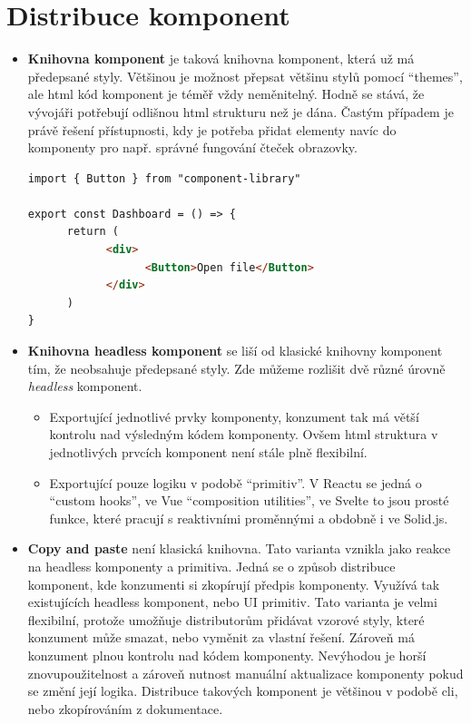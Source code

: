 \section{Distribuce komponent}

\begin{itemize}
  \item \textbf{Knihovna komponent} je taková knihovna komponent, která už má předepsané styly. Většinou je možnost přepsat většinu stylů pomocí ``themes'', ale \gls{html} kód komponent je téměř vždy neměnitelný.
        Hodně se stává, že vývojáři potřebují odlišnou \gls{html} strukturu než je dána.
        Častým případem je právě řešení přístupnosti, kdy je potřeba přidat elementy navíc do komponenty pro např. správné fungování čteček obrazovky.
        \begin{lstlisting}[caption={Ukázka použití komponentové knihovny}, label={component-distribution}, language=html]
import { Button } from "component-library"

export const Dashboard = () => {
      return (
            <div>
                  <Button>Open file</Button>
            </div>
      )
}
\end{lstlisting}
  \item \textbf{Knihovna headless komponent} se liší od klasické knihovny komponent tím, že neobsahuje předepsané styly.
        Zde můžeme rozlišit dvě různé úrovně \textit{headless} komponent.
        \begin{itemize}
          \item Exportující jednotlivé prvky komponenty, konzument tak má větší kontrolu nad výsledným kódem komponenty.
                Ovšem \gls{html} struktura v jednotlivých prvcích komponent není stále plně flexibilní.
          \item Exportující pouze logiku v podobě ``primitiv''. V Reactu se jedná o ``custom hooks'', ve Vue ``composition utilities'', ve Svelte to jsou prosté funkce, které pracují s reaktivními proměnnými a obdobně i ve Solid.js.\label{technology:dist}
        \end{itemize}
  \item \textbf{Copy and paste} není klasická knihovna.
        Tato varianta vznikla jako reakce na headless komponenty a primitiva.
        Jedná se o způsob distribuce komponent, kde konzumenti si zkopírují předpis komponenty.
        Využívá tak existujících headless komponent, nebo UI primitiv.
        Tato varianta je velmi flexibilní, protože umožňuje distributorům přidávat vzorové styly, které konzument může smazat, nebo vyměnit za vlastní řešení.
        Zároveň má konzument plnou kontrolu nad kódem komponenty.
        Nevýhodou je horší znovupoužitelnost a zároveň nutnost manuální aktualizace komponenty pokud se změní její logika.
        Distribuce takových komponent je většinou v podobě \gls{cli}, nebo zkopírováním z dokumentace.
\end{itemize}

